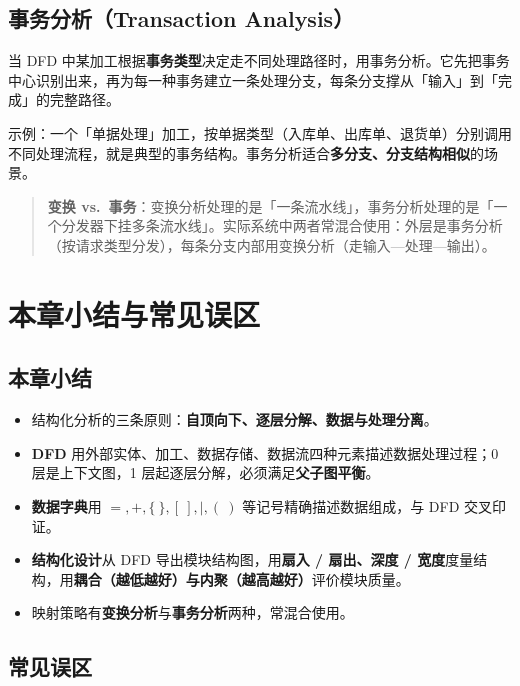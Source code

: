 \subsection{事务分析（Transaction Analysis）}

当 DFD 中某加工根据\textbf{事务类型}决定走不同处理路径时，用事务分析。它先把事务中心识别出来，再为每一种事务建立一条处理分支，每条分支撑从「输入」到「完成」的完整路径。

示例：一个「单据处理」加工，按单据类型（入库单、出库单、退货单）分别调用不同处理流程，就是典型的事务结构。事务分析适合\textbf{多分支、分支结构相似}的场景。

\begin{quote}
\textbf{变换 vs.\ 事务}：变换分析处理的是「一条流水线」，事务分析处理的是「一个分发器下挂多条流水线」。实际系统中两者常混合使用：外层是事务分析（按请求类型分发），每条分支内部用变换分析（走输入—处理—输出）。
\end{quote}

\section{本章小结与常见误区}

\subsection{本章小结}

\begin{itemize}
    \item 结构化分析的三条原则：\textbf{自顶向下、逐层分解、数据与处理分离}。
    \item \textbf{DFD} 用外部实体、加工、数据存储、数据流四种元素描述数据处理过程；0 层是上下文图，1 层起逐层分解，必须满足\textbf{父子图平衡}。
    \item \textbf{数据字典}用 $=,+,\{\ \},[\ ],|,(\ )$ 等记号精确描述数据组成，与 DFD 交叉印证。
    \item \textbf{结构化设计}从 DFD 导出模块结构图，用\textbf{扇入 / 扇出、深度 / 宽度}度量结构，用\textbf{耦合（越低越好）与内聚（越高越好）}评价模块质量。
    \item 映射策略有\textbf{变换分析}与\textbf{事务分析}两种，常混合使用。
\end{itemize}

\subsection{常见误区}

